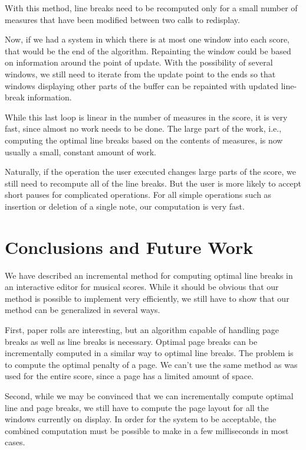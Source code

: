 \documentclass{article}
\begin{document}
With this method, line breaks need to be recomputed only for a small
number of measures that have been modified between two calls to
redisplay. 

Now, if we had a system in which there is at most one window into
each score, that would be the end of the algorithm.  Repainting the
window could be based on information around the point of update.  With
the possibility of several windows, we still need to iterate from the
update point to the ends so that windows displaying other parts of the
buffer can be repainted with updated line-break information. 

While this last loop is linear in the number of measures in the score,
it is very fast, since almost no work needs to be done.  The large
part of the work, i.e., computing the optimal line breaks based on the
contents of measures, is now usually a small, constant amount of
work. 

Naturally, if the operation the user executed changes large parts of
the score, we still need to recompute all of the line breaks.  But the
user is more likely to accept short pauses for complicated
operations.  For all simple operations such as insertion or deletion
of a single note, our computation is very fast.

\section{Conclusions and Future Work}

We have described an incremental method for computing optimal line
breaks in an interactive editor for musical scores.  While it should
be obvious that our method is possible to implement very efficiently,
we still have to show that our method can be generalized in several
ways.

First, paper rolls are interesting, but an algorithm capable of
handling page breaks as well as line breaks is necessary.  Optimal
page breaks can be incrementally computed in a similar way to optimal
line breaks.  The problem is to compute the optimal penalty of a
page.  We can't use the same method as was used for the entire score,
since a page has a limited amount of space.  

Second, while we may be convinced that we can incrementally compute
optimal line and page breaks, we still have to compute the page layout
for all the windows currently on display.  In order for the system to
be acceptable, the combined computation must be possible to make in a
few milliseconds in most cases.
\end{document}
